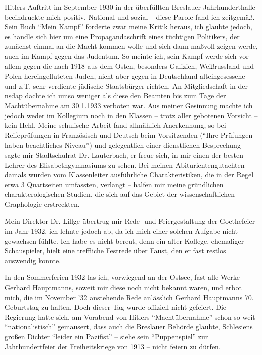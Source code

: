\documentclass[a5paper,pagesize,10pt,twoside=true]{scrbook}
\begin{document}
Hitlers Auftritt im September 1930 in der überfüllten Breslauer Jahrhunderthalle beeindruckte mich positiv. National und sozial -- diese Parole fand ich zeitgemäß. Sein Buch \enquote{Mein Kampf} forderte zwar meine Kritik heraus, ich glaubte jedoch, es handle sich hier um eine Propagandaschrift eines tüchtigen Politikers, der zunächst einmal an die Macht kommen wolle und sich dann maßvoll zeigen werde, auch im Kampf gegen das Judentum. So meinte ich, sein Kampf werde sich vor allem gegen die nach 1918 aus dem Osten, besonders Galizien, Weißrussland und Polen hereingefluteten Juden, nicht aber gegen in Deutschland alteingesessene und z.T. sehr verdiente jüdische Staatsbürger richten. An Mitgliedschaft in der \ac{nsdap} dachte ich umso weniger als diese den Beamten bis zum Tage der Machtübernahme am 30.1.1933 verboten war. Aus meiner Gesinnung machte ich jedoch weder im Kollegium noch in den Klassen -- trotz aller gebotenen Vorsicht -- kein Hehl. Meine schulische Arbeit fand allmählich Anerkennung, so bei Reifeprüfungen in Französisch und Deutsch beim Vorsitzenden (\enquote{Ihre Prüfungen haben beachtliches Niveau}) und gelegentlich einer dienstlichen Besprechung sagte mir Stadtschulrat Dr. Lauterbach, er freue sich, in mir einen der besten Lehrer des Elisabethgymnasiums zu sehen. Bei meinen Abiturientengutachten -- damals wurden vom Klassenleiter ausführliche Charakteristiken, die in der Regel etwa 3 Quartseiten umfassten, verlangt -- halfen mir meine gründlichen charakterologischen Studien, die sich auf das Gebiet der wissenschaftlichen Graphologie erstreckten.

Mein Direktor Dr. Lillge übertrug mir Rede- und Feiergestaltung der Goethefeier im Jahr 1932, ich lehnte jedoch ab, da ich mich einer solchen Aufgabe nicht gewachsen fühlte. Ich habe es nicht bereut, denn ein alter Kollege, ehemaliger Schauspieler, hielt eine treffliche Festrede über Faust, den er fast restlos auswendig konnte.

In den Sommerferien 1932 las ich, vorwiegend an der Ostsee, fast alle Werke Gerhard Hauptmanns, soweit mir diese noch nicht bekannt waren, und erbot mich, die im November '32 anstehende Rede anlässlich Gerhard Hauptmanns 70. Geburtstag zu halten. Doch dieser Tag wurde offiziell nicht gefeiert. Die Regierung hatte sich, am Vorabend von Hitlers \enquote{Machtübernahme} schon so weit \enquote{nationalistisch} gemausert, dass auch die Breslauer Behörde glaubte, Schlesiens großen Dichter \enquote{leider ein Pazifist} -- siehe sein \enquote{Puppenspiel} zur Jahrhundertfeier der Freiheitskriege von 1913 -- nicht feiern zu dürfen.
\end{document}
